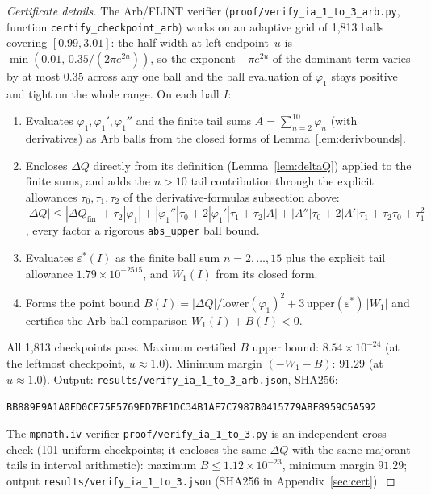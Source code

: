 \documentclass[11pt]{article}
\theoremstyle{definition}
\theoremstyle{remark}
\begin{document}
\begin{proof}[Certificate details]
The Arb/FLINT verifier
(\texttt{proof/verify\_ia\_1\_to\_3\_arb.py}, function \texttt{certify\_checkpoint\_arb})
works on an adaptive grid of 1{,}813 balls covering $[0.99, 3.01]$:
the half-width at left endpoint~$u$ is
$\min(0.01,\, 0.35/(2\pi e^{2u}))$, so the exponent $-\pi e^{2u}$ of the
dominant term varies by at most $0.35$ across any one ball and the ball
evaluation of $\varphi_1$ stays positive and tight on the whole range.
On each ball $I$:
\begin{enumerate}[leftmargin=2em,itemsep=1pt]
\item Evaluates $\varphi_1, \varphi_1', \varphi_1''$ and the finite tail
  sums $A = \sum_{n=2}^{10}\varphi_n$ (with derivatives) as Arb balls
  from the closed forms of Lemma~\ref{lem:derivbounds}.
\item Encloses $\Delta Q$ directly from its definition
  (Lemma~\ref{lem:deltaQ}) applied to the finite sums, and adds the
  $n > 10$ tail contribution through the explicit allowances
  $\tau_0, \tau_1, \tau_2$ of the derivative-formulas subsection above:
  $|\Delta Q| \leq |\Delta Q_{\mathrm{fin}}|
  + \tau_2|\varphi_1| + |\varphi_1''|\tau_0 + 2|\varphi_1'|\tau_1
  + \tau_2|A| + |A''|\tau_0 + 2|A'|\tau_1 + \tau_2\tau_0 + \tau_1^2$,
  every factor a rigorous \texttt{abs\_upper} ball bound.
\item Evaluates $\varepsilon^*(I)$ as the finite ball sum $n = 2,\ldots,15$
  plus the explicit tail allowance $1.79\times 10^{-2515}$, and
  $W_1(I)$ from its closed form.
\item Forms the point bound
  $B(I) = |\Delta Q|/\mathrm{lower}(\varphi_1)^2
  + 3\,\mathrm{upper}(\varepsilon^*)\,|W_1|$
  and certifies the Arb ball comparison $W_1(I) + B(I) < 0$.
\end{enumerate}
All 1{,}813 checkpoints pass.
Maximum certified $B$ upper bound: $8.54\times 10^{-24}$
(at the leftmost checkpoint, $u\approx1.0$).
Minimum margin $(-W_1 - B)$: $91.29$ (at $u\approx1.0$).
Output: \texttt{results/verify\_ia\_1\_to\_3\_arb.json},
SHA256:

{\small\verb|BB889E9A1A0FD0CE75F5769FD7BE1DC34B1AF7C7987B0415779ABF8959C5A592|}

\noindent The \texttt{mpmath.iv} verifier
\texttt{proof/verify\_ia\_1\_to\_3.py} is an independent cross-check
(101 uniform checkpoints; it encloses the same $\Delta Q$ with the same
majorant tails in interval arithmetic): maximum $B \leq 1.12\times 10^{-23}$,
minimum margin $91.29$; output \texttt{results/verify\_ia\_1\_to\_3.json}
(SHA256 in Appendix~\ref{sec:cert}).


\end{proof}
\end{document}

